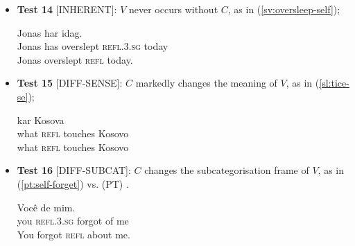 \documentclass[output=paper,modfonts]{langscibook}
\begin{document}
\begin{itemize}
\item[] \textbf{Test 14} [INHERENT]: $V$ never occurs without $C$, as in (\ref{sv:oversleep-self});

\ea \label{sv:oversleep-self}
\settowidth {}
\gll Jonas har   idag. \\
Jonas has overslept \textsc{refl.3.sg} today\\ 
\glt Jonas overslept \textsc{refl} today. 
\z

\item[] \textbf{Test 15} [DIFF-SENSE]: $C$ markedly changes the meaning of $V$, as in (\ref{sl:tice-se});


\ea \label{sl:tice-se}
\settowidth {}
\gll kar   Kosova \\
what \textsc{refl} touches Kosovo\\ 
\glt what \textsc{refl} touches Kosovo 
\z

\item[] \textbf{Test 16} [DIFF-SUBCAT]: $C$ changes the subcategorisation frame of $V$, as in (\ref{pt:self-forget}) vs.
(PT) .


\ea \label{pt:self-forget}
\settowidth {}
\gll Você   de mim. \\
you \textsc{refl.3.sg} forgot of me\\ 
\glt You forgot \textsc{refl} about me. 
\z

\end{itemize}
\end{document}
